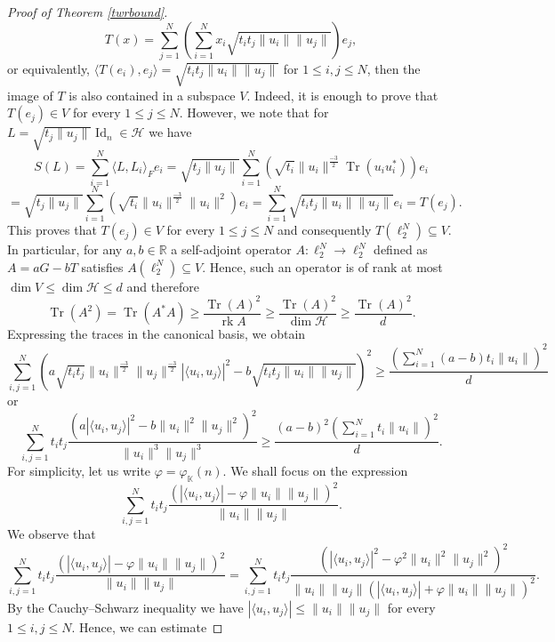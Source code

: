 \documentclass[12pt, reqno]{amsart}
\theoremstyle{definition}
\theoremstyle{remark}
\numberwithin{equation}{section}
\DeclareMathOperator{\tr}{Tr}
\DeclareMathOperator{\id}{Id}
\DeclareMathOperator{\rk}{rk}
\begin{document}
\begin{proof}[Proof of Theorem \ref{twrbound}]
$$T(x) = \sum_{j=1}^{N} \left ( \sum_{i=1}^{N} x_i \sqrt{t_it_j \|u_i\| \|u_j\|} \right ) e_j,$$
or equivalently, $\langle T(e_i), e_j \rangle = \sqrt{t_it_j \|u_i\| \|u_j\|}$ for $1 \leq i, j \leq N$, then the image of $T$ is also contained in a subspace $V$. Indeed, it is enough to prove that $T(e_j) \in V$ for every $1 \leq j \leq N$. However, we note that for $L = \sqrt{t_j \|u_j\|} \id_n \in \mathcal{H}$ we have
$$S(L) = \sum_{i=1}^{N} \langle L, L_i \rangle_F e_i = \sqrt{t_j \|u_j\|} \sum_{i=1}^{N}  \left ( \sqrt{t_i} \|u_i\|^{\frac{-3}{2}} \tr(u_iu_i^*) \right ) e_i$$
$$=\sqrt{t_j \|u_j\|} \sum_{i=1}^{N} \left (  \sqrt{t_i} \|u_i\|^{\frac{-3}{2}} \|u_i\|^2 \right ) e_i = \sum_{i=1}^{N} \sqrt{t_i t_j \|u_i\| \|u_j\| } e_i = T(e_j).$$
This proves that $T(e_j) \in V$ for every $1 \leq j \leq N$ and consequently $T(\ell_2^N) \subseteq V$. In particular, for any $a, b \in \mathbb{R}$ a self-adjoint operator $A: \ell_2^N \to \ell_2^N$ defined as $A = a G - b T$ satisfies $A(\ell_2^N) \subseteq V$. Hence, such an operator is of rank at most $\dim V \leq \dim \mathcal{H} \leq d$ and therefore
\begin{equation}
\label{trdim}
\tr(A^2)=\tr(A^*A) \geq \frac{\tr(A)^2}{\rk A} \geq \frac{\tr(A)^2}{\dim \mathcal{H}} \geq \frac{\tr(A)^2}{d}.
\end{equation}
Expressing the traces in the canonical basis, we obtain
$$\sum_{i, j=1}^{N} \left ( a \sqrt{t_it_j}\|u_i\|^{\frac{-3}{2}} \|u_j\|^{\frac{-3}{2}} |\langle u_i, u_j \rangle |^2 - b \sqrt{t_it_j \|u_i\| \|u_j\|}  \right )^2 \geq \frac{\left (  \sum_{i=1}^{N} (a-b) t_i \|u_i\|   \right )^2}{d}$$
or
\begin{equation}
\label{traceestimate}
\sum_{i, j=1}^{N} t_i t_j \frac{  \left (a |\langle u_i, u_j \rangle|^2 - b \|u_i\|^2 \|u_j\|^2 \right )^2}{\|u_i\|^3\|u_j\|^3} \geq  \frac{(a-b)^2 \left (  \sum_{i=1}^{N}  t_i \|u_i\|   \right )^2}{d}.
\end{equation}
For simplicity, let us write $\varphi = \varphi_{\mathbb{K}}(n)$. We shall focus on the expression
$$\sum_{i, j=1}^{N} t_i t_j \frac{\left (|\langle u_i, u_j \rangle| - \varphi \|u_i\| \|u_j\| \right )^2}{\|u_i\| \|u_j\|}.$$
We observe that
$$\sum_{i, j=1}^{N} t_i t_j \frac{\left (|\langle u_i, u_j \rangle| - \varphi \|u_i\| \|u_j\| \right )^2}{\|u_i\| \|u_j\|}=\sum_{i, j=1}^{N} t_it_j \frac{\left (|\langle u_i, u_j \rangle|^2 - \varphi^2 \|u_i\|^2 \|u_j\|^2 \right )^2}{\|u_i\| \|u_j\|\left (|\langle u_i, u_j \rangle| + \varphi  \|u_i\| \|u_j\| \right )^2}.$$
By the Cauchy--Schwarz inequality we have $| \langle u_i, u_j \rangle | \leq \|u_i\| \|u_j\|$ for every $1 \leq i, j \leq N$. Hence, we can estimate

\end{proof}
\end{document}
